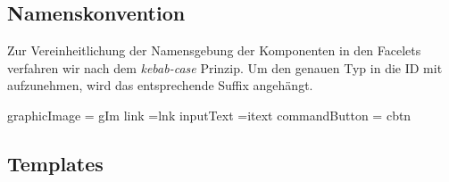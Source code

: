 \newcommand{\ftable}[1]{\begin{sidewaystable}
\begin{tabular}[H]{ m{2cm} m{3cm} m{6cm} m{2.5cm} m{2cm} m{2cm} }
    \toprule
    \textbf{ID} & \textbf{Typ} & \textbf{Beschreibung} & \textbf{Binding} & \textbf{Constraints} & \textbf{Validator \newline Converter} \\
    \midrule
    #1
    \bottomrule
\end{tabular}
\end{sidewaystable}
}

\newcommand{\fentry}[6]{#1 & #2 & #3 & #4 & #5 & #6\\}


\subsection{Namenskonvention}

Zur Vereinheitlichung der Namensgebung der Komponenten in den Facelets verfahren wir nach dem \emph{kebab-case} Prinzip. Um den genauen Typ in die ID mit aufzunehmen, wird das entsprechende Suffix angehängt.

 graphicImage = gIm link =lnk inputText =itext commandButton = cbtn

\subsection{Templates}


